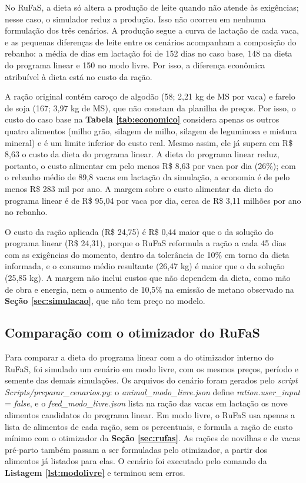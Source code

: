 \documentclass[a4paper,12pt]{article}
\begin{document}
\newpage
No RuFaS, a dieta só altera a produção de leite quando não atende às exigências; nesse caso, o simulador reduz a produção. Isso não ocorreu em nenhuma formulação dos três cenários. A produção segue a curva de lactação de cada vaca, e as pequenas diferenças de leite entre os cenários acompanham a composição do rebanho: a média de dias em lactação foi de 152 dias no caso base, 148 na dieta do programa linear e 150 no modo livre. Por isso, a diferença econômica atribuível à dieta está no custo da ração.

A ração original contém caroço de algodão (58; 2,21 kg de MS por vaca) e farelo de soja (167; 3,97 kg de MS), que não constam da planilha de preços. Por isso, o custo do caso base na \textbf{Tabela \ref{tab:economico}} considera apenas os outros quatro alimentos (milho grão, silagem de milho, silagem de leguminosa e mistura mineral) e é um limite inferior do custo real. Mesmo assim, ele já supera em R\$ 8,63 o custo da dieta do programa linear. A dieta do programa linear reduz, portanto, o custo alimentar em pelo menos R\$ 8,63 por vaca por dia (26\%); com o rebanho médio de 89,8 vacas em lactação da simulação, a economia é de pelo menos R\$ 283 mil por ano. A margem sobre o custo alimentar da dieta do programa linear é de R\$ 95,04 por vaca por dia, cerca de R\$ 3,11 milhões por ano no rebanho.

O custo da ração aplicada (R\$ 24,75) é R\$ 0,44 maior que o da solução do programa linear (R\$ 24,31), porque o RuFaS reformula a ração a cada 45 dias com as exigências do momento, dentro da tolerância de 10\% em torno da dieta informada, e o consumo médio resultante (26,47 kg) é maior que o da solução (25,85 kg). A margem não inclui custos que não dependem da dieta, como mão de obra e energia, nem o aumento de 10,5\% na emissão de metano observado na \textbf{Seção \ref{sec:simulacao}}, que não tem preço no modelo.

\subsection{Comparação com o otimizador do RuFaS}\label{sec:modolivre}

Para comparar a dieta do programa linear com a do otimizador interno do RuFaS, foi simulado um cenário em modo livre, com os mesmos preços, período e semente das demais simulações. Os arquivos do cenário foram gerados pelo \textit{script Scripts/\allowbreak preparar\_\allowbreak cenarios.py}: o \textit{animal\_\allowbreak modo\_\allowbreak livre.json} define \textit{ration.user\_input} = \textit{false}, e o \textit{feed\_\allowbreak modo\_\allowbreak livre.json} lista na ração das vacas em lactação os nove alimentos candidatos do programa linear. Em modo livre, o RuFaS usa apenas a lista de alimentos de cada ração, sem os percentuais, e formula a ração de custo mínimo com o otimizador da \textbf{Seção \ref{sec:rufas}}. As rações de novilhas e de vacas pré-parto também passam a ser formuladas pelo otimizador, a partir dos alimentos já listados para elas. O cenário foi executado pelo comando da \textbf{Listagem \ref{lst:modolivre}} e terminou sem erros.
\end{document}
